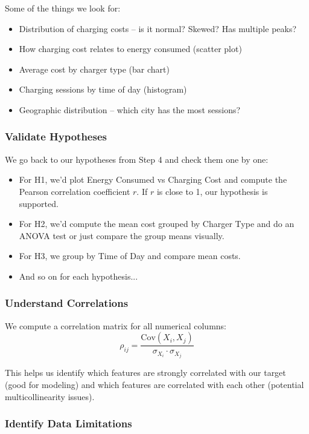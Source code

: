 \documentclass[12pt, a4paper]{article}
\begin{document}
Some of the things we look for:
\begin{itemize}
    \item Distribution of charging costs -- is it normal? Skewed? Has multiple peaks?
    \item How charging cost relates to energy consumed (scatter plot)
    \item Average cost by charger type (bar chart)
    \item Charging sessions by time of day (histogram)
    \item Geographic distribution -- which city has the most sessions?
\end{itemize}

\subsubsection{Validate Hypotheses}

We go back to our hypotheses from Step 4 and check them one by one:
\begin{itemize}
    \item For H1, we'd plot Energy Consumed vs Charging Cost and compute the Pearson correlation coefficient $r$. If $r$ is close to 1, our hypothesis is supported.
    \item For H2, we'd compute the mean cost grouped by Charger Type and do an ANOVA test or just compare the group means visually.
    \item For H3, we group by Time of Day and compare mean costs.
    \item And so on for each hypothesis...
\end{itemize}

\subsubsection{Understand Correlations}

We compute a correlation matrix for all numerical columns:
$$\rho_{ij} = \frac{\text{Cov}(X_i, X_j)}{\sigma_{X_i} \cdot \sigma_{X_j}}$$

This helps us identify which features are strongly correlated with our target (good for modeling) and which features are correlated with each other (potential multicollinearity issues).

\subsubsection{Identify Data Limitations}
\end{document}
